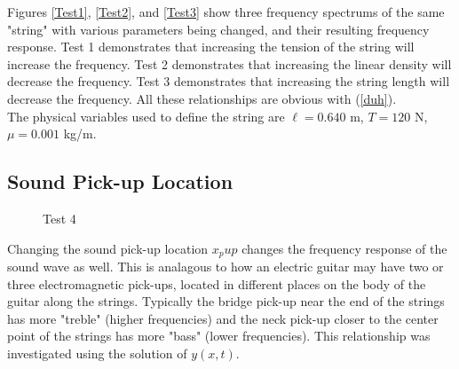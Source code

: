 \documentclass[%
 reprint,
 amsmath,amssymb,
 aps,
]{revtex4-1}
\begin{document}
Figures \ref{Test1}, \ref{Test2}, and \ref{Test3} show three frequency spectrums of the same "string" with various parameters being changed, and their resulting frequency response. Test 1 demonstrates that increasing the tension of the string will increase the frequency. Test 2 demonstrates that increasing the linear density will decrease the frequency. Test 3 demonstrates that increasing the string length will decrease the frequency. All these relationships are obvious with (\ref{duh}).\\

The physical variables used to define the string are $\ell = 0.640$ m, $T = 120$ N, $\mu = 0.001$ kg/m. 





\subsection{\label{sec:level1}Sound Pick-up Location}
\begin{figure}[h]
\caption{Test 4}
\label{Test4}
\end{figure}
Changing the sound pick-up location $x_pup$ changes the frequency response of the sound wave as well. This is analagous to how an electric guitar may have two or three electromagnetic pick-ups, located in different places on the body of the guitar along the strings. Typically the bridge pick-up near the end of the strings has more "treble" (higher frequencies) and the neck pick-up closer to the center point of the strings has more "bass" (lower frequencies). This relationship was investigated using the solution of $y(x,t)$.\\
\end{document}
